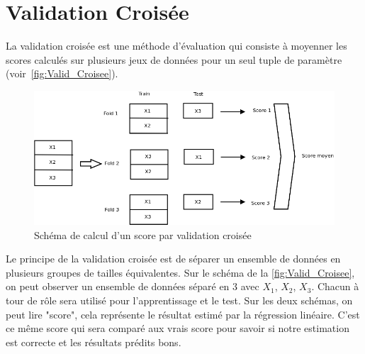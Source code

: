 \section{Validation Croisée}

La validation croisée est une méthode d'évaluation qui consiste à moyenner les scores calculés sur plusieurs jeux de données pour un seul tuple de paramètre (voir~\autoref{fig:Valid_Croisee}).

\begin{figure}[htpb]
	\centering
	\includegraphics[scale = 0.25]{images/Valid_Croisee_param}
	\caption{Schéma de calcul d'un score par validation croisée}
	\label{fig:Valid_Croisee}
\end{figure}


Le principe de la validation croisée est de séparer un ensemble de données en plusieurs groupes de tailles équivalentes.
Sur le schéma de la  \autoref{fig:Valid_Croisee}, on peut observer un ensemble de données séparé en 3 avec $X_{1}$, $X_{2}$, $X_{3}$.
Chacun à tour de rôle sera utilisé pour l'apprentissage et le test. 
Sur les deux schémas, on peut lire "score", cela représente le résultat estimé par la régression linéaire. C'est ce même score qui sera comparé aux vrais score pour savoir si notre estimation est correcte et les résultats prédits bons. 

